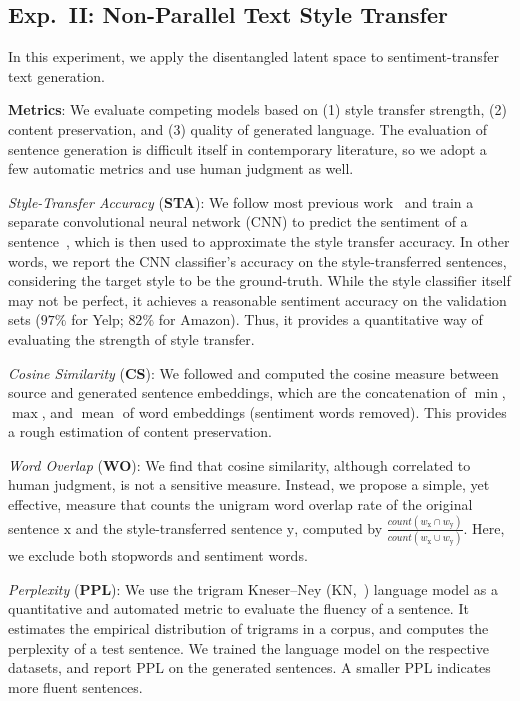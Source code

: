 \documentclass[11pt,a4paper]{article}
\begin{document}
\subsection{Exp.~II: Non-Parallel Text Style Transfer}
In this experiment, we apply the disentangled latent space to sentiment-transfer text generation.

\textbf{Metrics}: We evaluate competing models based on (1) style transfer strength, (2) content preservation, and (3) quality of generated language. The evaluation of sentence generation is difficult itself in contemporary literature, so we adopt a few automatic metrics and use human judgment as well.

\textit{Style-Transfer Accuracy} (\textbf{STA}):
We follow most previous work~\cite{hu2017toward,shen2017style,fu2018style} and train a separate convolutional neural network (CNN) to predict the sentiment of a sentence~\cite{kim2014convolutional}, which is then used to approximate the style transfer accuracy.
In other words, we report the CNN classifier's accuracy on the style-transferred sentences, considering the target style to be the ground-truth.
While the style classifier itself may not be perfect, it achieves a reasonable sentiment accuracy on the validation sets ($97\%$ for Yelp; $82\%$ for Amazon).
Thus, it provides a quantitative way of evaluating the strength of style transfer.

\textit{Cosine Similarity} (\textbf{CS}):
We followed \citet{fu2018style} and computed the cosine measure between source and generated sentence embeddings, which are the concatenation of $\operatorname{min}$, $\operatorname{max}$, and $\operatorname{mean}$ of word embeddings (sentiment words removed). 
This provides a rough estimation of content preservation.

\textit{Word Overlap} (\textbf{WO}):
We find that cosine similarity, although correlated to human judgment, is not a sensitive measure.
Instead, we propose a simple, yet effective, measure that counts the unigram word overlap rate of the original sentence $\mathrm x$ and the style-transferred sentence $\mathrm y$, computed by $\frac{count(w_{\mathrm x} \cap w_{\mathrm y})}{count(w_{\mathrm x} \cup w_{\mathrm y})}$.
Here, we exclude both stopwords and sentiment words.


\textit{Perplexity} (\textbf{PPL}): We use the trigram Kneser--Ney (KN,~\citeyear{kneser1995improved}) language model as a quantitative and automated metric to evaluate the fluency of a sentence.
It estimates the empirical distribution of trigrams in a corpus, and computes the perplexity of a test sentence.
We trained the language model on the respective datasets, and report PPL on the generated sentences. A smaller PPL indicates more fluent sentences.
\end{document}
